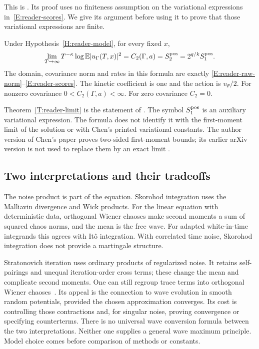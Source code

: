 This is . Its proof uses no finiteness assumption
on the variational expressions in~\eqref{E:reader-scores}. We give its argument
before using it to prove that those variational expressions are finite.

\begin{theorem}\label{T:reader-limit}
  Under Hypothesis~\ref{H:reader-model}, for every fixed $x$,
  \begin{equation}\label{E:reader-limit}
    \lim_{T\to\infty}T^{-\kappa}\log\mathbb E|u_\Gamma(T,x)|^2
    =C_2(\Gamma,a)=S^{\mathrm{pos}}_2=2^{q/k}S^{\mathrm{pos}}_1.
  \end{equation}
  The domain, covariance norm and rates in this formula are exactly
  \eqref{E:reader-raw-norm}--\eqref{E:reader-scores}. The kinetic coefficient is
  one and the action is $v_\Psi/2$. For nonzero covariance $0 < C_2(\Gamma,a) <
  \infty$. For zero covariance $C_2 = 0$.
\end{theorem}



Theorem~\ref{T:reader-limit} is the statement of
. The symbol $S^{\mathrm{pos}}_1$ is an auxiliary
variational expression. The formula does not identify it with the first-moment
limit of the solution or with Chen's printed variational constants. The author
version of Chen's paper proves two-sided first-moment bounds; its earlier arXiv
version is not used to replace them by an exact limit
\cite{chen:author2026:time-dependency}.

\subsection{Two interpretations and their tradeoffs}

The noise product is part of the equation. Skorohod integration uses the
Malliavin divergence and Wick products. For the linear equation with
deterministic data, orthogonal Wiener chaoses make second moments a sum of
squared chaos norms, and the mean is the free wave. For adapted white-in-time
integrands this agrees with It\^o integration. With correlated time noise,
Skorohod integration does not provide a martingale structure.

Stratonovich iteration uses ordinary products of regularized noise. It retains
self-pairings and unequal iteration-order cross terms; these change the mean
and complicate second moments. One can still regroup trace terms into
orthogonal Wiener chaoses~\cite{balan:22:stratonovich}. Its appeal is the
connection to wave evolution in smooth random potentials, provided the chosen
approximation converges. Its cost is controlling those contractions and,
for singular noise, proving convergence or specifying counterterms. There is
no universal wave conversion formula between the two interpretations. Neither
one supplies a general wave maximum principle. Model choice comes before
comparison of methods or constants.


